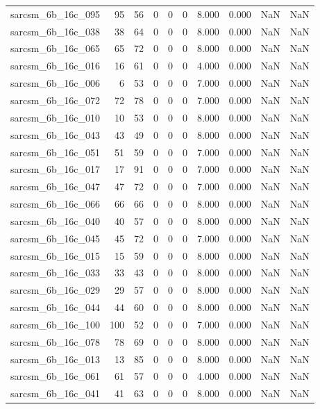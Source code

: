 \documentclass{article}
\begin{document}
\begin{longtable}{lrrrrrrrrr}
sarcsm\_6b\_16c\_095 & 95 & 56 & 0 & 0 & 0 & 8.000 & 0.000 & NaN & NaN \\
sarcsm\_6b\_16c\_038 & 38 & 64 & 0 & 0 & 0 & 8.000 & 0.000 & NaN & NaN \\
sarcsm\_6b\_16c\_065 & 65 & 72 & 0 & 0 & 0 & 8.000 & 0.000 & NaN & NaN \\
sarcsm\_6b\_16c\_016 & 16 & 61 & 0 & 0 & 0 & 4.000 & 0.000 & NaN & NaN \\
sarcsm\_6b\_16c\_006 & 6 & 53 & 0 & 0 & 0 & 7.000 & 0.000 & NaN & NaN \\
sarcsm\_6b\_16c\_072 & 72 & 78 & 0 & 0 & 0 & 7.000 & 0.000 & NaN & NaN \\
sarcsm\_6b\_16c\_010 & 10 & 53 & 0 & 0 & 0 & 8.000 & 0.000 & NaN & NaN \\
sarcsm\_6b\_16c\_043 & 43 & 49 & 0 & 0 & 0 & 8.000 & 0.000 & NaN & NaN \\
sarcsm\_6b\_16c\_051 & 51 & 59 & 0 & 0 & 0 & 7.000 & 0.000 & NaN & NaN \\
sarcsm\_6b\_16c\_017 & 17 & 91 & 0 & 0 & 0 & 7.000 & 0.000 & NaN & NaN \\
sarcsm\_6b\_16c\_047 & 47 & 72 & 0 & 0 & 0 & 7.000 & 0.000 & NaN & NaN \\
sarcsm\_6b\_16c\_066 & 66 & 66 & 0 & 0 & 0 & 8.000 & 0.000 & NaN & NaN \\
sarcsm\_6b\_16c\_040 & 40 & 57 & 0 & 0 & 0 & 8.000 & 0.000 & NaN & NaN \\
sarcsm\_6b\_16c\_045 & 45 & 72 & 0 & 0 & 0 & 7.000 & 0.000 & NaN & NaN \\
sarcsm\_6b\_16c\_015 & 15 & 59 & 0 & 0 & 0 & 8.000 & 0.000 & NaN & NaN \\
sarcsm\_6b\_16c\_033 & 33 & 43 & 0 & 0 & 0 & 8.000 & 0.000 & NaN & NaN \\
sarcsm\_6b\_16c\_029 & 29 & 57 & 0 & 0 & 0 & 8.000 & 0.000 & NaN & NaN \\
sarcsm\_6b\_16c\_044 & 44 & 60 & 0 & 0 & 0 & 8.000 & 0.000 & NaN & NaN \\
sarcsm\_6b\_16c\_100 & 100 & 52 & 0 & 0 & 0 & 7.000 & 0.000 & NaN & NaN \\
sarcsm\_6b\_16c\_078 & 78 & 69 & 0 & 0 & 0 & 8.000 & 0.000 & NaN & NaN \\
sarcsm\_6b\_16c\_013 & 13 & 85 & 0 & 0 & 0 & 8.000 & 0.000 & NaN & NaN \\
sarcsm\_6b\_16c\_061 & 61 & 57 & 0 & 0 & 0 & 4.000 & 0.000 & NaN & NaN \\
sarcsm\_6b\_16c\_041 & 41 & 63 & 0 & 0 & 0 & 8.000 & 0.000 & NaN & NaN \\

\end{longtable}
\end{document}
